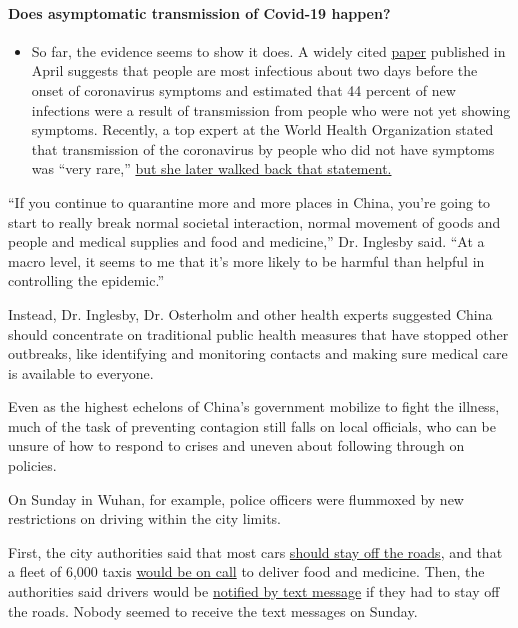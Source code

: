 \begin{itemize}
{  \paragraph{Does asymptomatic transmission of Covid-19
  happen?}\label{does-asymptomatic-transmission-of-covid-19-happen}}

  \begin{itemize}
  \tightlist
  \item
    So far, the evidence seems to show it does. A widely cited
    \href{https://www.nature.com/articles/s41591-020-0869-5}{paper}
    published in April suggests that people are most infectious about
    two days before the onset of coronavirus symptoms and estimated that
    44 percent of new infections were a result of transmission from
    people who were not yet showing symptoms. Recently, a top expert at
    the World Health Organization stated that transmission of the
    coronavirus by people who did not have symptoms was ``very rare,''
    \href{https://www.nytimes.com/2020/06/09/world/coronavirus-updates.html?action=click\&pgtype=Article\&state=default\&region=MAIN_CONTENT_3\&context=storylines_faq\#link-1f302e21}{but
    she later walked back that statement.}
  \end{itemize}
\end{itemize}

``If you continue to quarantine more and more places in China, you're
going to start to really break normal societal interaction, normal
movement of goods and people and medical supplies and food and
medicine,'' Dr. Inglesby said. ``At a macro level, it seems to me that
it's more likely to be harmful than helpful in controlling the
epidemic.''

Instead, Dr. Inglesby, Dr. Osterholm and other health experts suggested
China should concentrate on traditional public health measures that have
stopped other outbreaks, like identifying and monitoring contacts and
making sure medical care is available to everyone.

Even as the highest echelons of China's government mobilize to fight the
illness, much of the task of preventing contagion still falls on local
officials, who can be unsure of how to respond to crises and uneven
about following through on policies.

On Sunday in Wuhan, for example, police officers were flummoxed by new
restrictions on driving within the city limits.

First, the city authorities said that most cars
\href{https://mp.weixin.qq.com/s?src=11\&timestamp=1580035588\&ver=2120\&signature=SxuKbIMYjrZ4tw2dH2Sf-41vvxx9SlwFgJfynxcr6wjvcfvE4FyGoNh50zGorYJ7JeaFWmsNZELIGwOekOTIi98jPNkDdjwEKebM*JE3TAIdS17Ax5-oi0gQ14Fa6mYW\&new=1}{should
stay off the roads}, and that a fleet of 6,000 taxis
\href{http://www.chinanews.com/gn/2020/01-26/9069778.shtml}{would be on
call} to deliver food and medicine. Then, the authorities said drivers
would be
\href{https://baijiahao.baidu.com/s?id=1656737257191494058\&wfr=spider\&for=pc}{notified
by text message} if they had to stay off the roads. Nobody seemed to
receive the text messages on Sunday.


